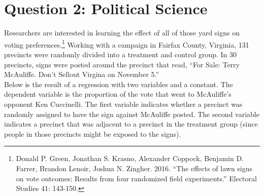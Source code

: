 \documentclass[12pt,letterpaper]{article}
\begin{document}
\newpage

\section*{Question 2: Political Science}
\vspace{.25cm}
\noindent 	Researchers are interested in learning the effect of all of those yard signs on voting preferences.\footnote{Donald P. Green, Jonathan	S. Krasno, Alexander Coppock, Benjamin D. Farrer,	Brandon Lenoir, Joshua N. Zingher. 2016. ``The effects of lawn signs on vote outcomes: Results from four randomized field experiments.'' Electoral Studies 41: 143-150. } Working with a campaign in Fairfax County, Virginia, 131 precincts were randomly divided into a treatment and control group. In 30 precincts, signs were posted around the precinct that read, ``For Sale: Terry McAuliffe. Don't Sellout Virgina on November 5.'' \\

Below is the result of a regression with two variables and a constant.  The dependent variable is the proportion of the vote that went to McAuliffe's opponent Ken Cuccinelli. The first variable indicates whether a precinct was randomly assigned to have the sign against McAuliffe posted. The second variable indicates
a precinct that was adjacent to a precinct in the treatment group (since people in those precincts might be exposed to the signs).  \\
\end{document}
